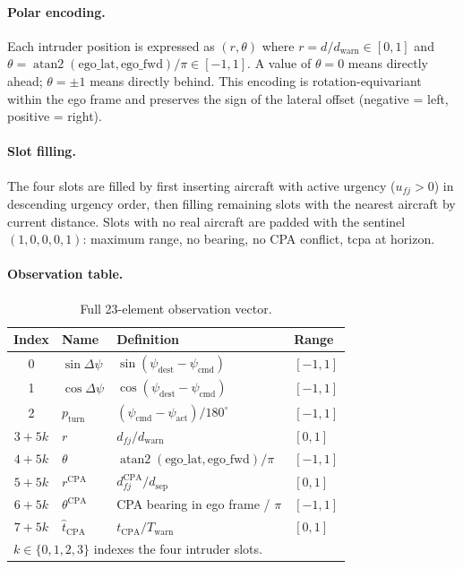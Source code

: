 \documentclass[11pt, a4paper]{article}
\begin{document}
\paragraph{Polar encoding.}
Each intruder position is expressed as
$(r, \theta)$ where $r = d / d_\text{warn} \in [0,1]$ and
$\theta = \operatorname{atan2}(\text{ego\_lat}, \text{ego\_fwd}) / \pi \in [-1,1]$.
A value of $\theta = 0$ means directly ahead; $\theta = \pm 1$ means directly behind.
This encoding is rotation-equivariant within the ego frame and preserves the
sign of the lateral offset (negative = left, positive = right).

\paragraph{Slot filling.}
The four slots are filled by first inserting aircraft with active urgency
($u_{fj} > 0$) in descending urgency order, then filling remaining slots with the
nearest aircraft by current distance.
Slots with no real aircraft are padded with the sentinel $(1, 0, 0, 0, 1)$:
maximum range, no bearing, no CPA conflict, tcpa at horizon.

\paragraph{Observation table.}

\begin{table}[h]
\centering
\caption{Full 23-element observation vector.}
\label{tab:obs}
\smallskip
\begin{tabular}{clll}
\toprule
\textbf{Index} & \textbf{Name} & \textbf{Definition} & \textbf{Range} \\
\midrule
0 & $\sin\Delta\psi$ & $\sin(\psi_\text{dest} - \psi_\text{cmd})$ & $[-1,1]$ \\
1 & $\cos\Delta\psi$ & $\cos(\psi_\text{dest} - \psi_\text{cmd})$ & $[-1,1]$ \\
2 & $p_\text{turn}$  & $(\psi_\text{cmd} - \psi_\text{act}) / 180^\circ$ & $[-1,1]$ \\
\midrule
$3{+}5k$ & $r$         & $d_{fj} / d_\text{warn}$ & $[0,1]$ \\
$4{+}5k$ & $\theta$    & $\operatorname{atan2}(\text{ego\_lat}, \text{ego\_fwd})/\pi$ & $[-1,1]$ \\
$5{+}5k$ & $r^\text{CPA}$ & $d^\text{CPA}_{fj} / d_\text{sep}$ & $[0,1]$ \\
$6{+}5k$ & $\theta^\text{CPA}$ & CPA bearing in ego frame / $\pi$ & $[-1,1]$ \\
$7{+}5k$ & $\hat{t}_\text{CPA}$ & $t_\text{CPA} / T_\text{warn}$ & $[0,1]$ \\
\bottomrule
\multicolumn{4}{l}{\small $k \in \{0,1,2,3\}$ indexes the four intruder slots.}
\end{tabular}
\end{table}
\end{document}

